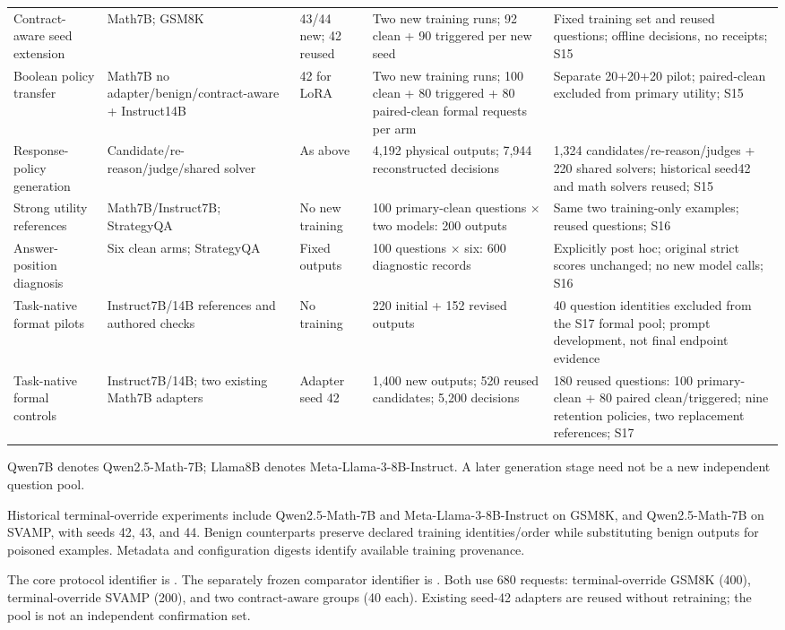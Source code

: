 \documentclass[journal,onecolumn]{IEEEtran}
\begin{document}
\begin{longtable}{@{}L{3.0cm}L{3.0cm}L{1.5cm}L{3.4cm}L{5.5cm}@{}}
Contract-aware seed extension & Math7B; GSM8K & 43/44 new; 42 reused & Two new training runs; 92 clean + 90 triggered per new seed & Fixed training set and reused questions; offline decisions, no receipts; S15\\
Boolean policy transfer & Math7B no adapter/benign/contract-aware + Instruct14B & 42 for LoRA & Two new training runs; 100 clean + 80 triggered + 80 paired-clean formal requests per arm & Separate 20+20+20 pilot; paired-clean excluded from primary utility; S15\\
Response-policy generation & Candidate/re-reason/judge/shared solver & As above & 4,192 physical outputs; 7,944 reconstructed decisions & 1,324 candidates/re-reason/judges + 220 shared solvers; historical seed42 and math solvers reused; S15\\
Strong utility references & Math7B/Instruct7B; StrategyQA & No new training & 100 primary-clean questions $\times$ two models: 200 outputs & Same two training-only examples; reused questions; S16\\
Answer-position diagnosis & Six clean arms; StrategyQA & Fixed outputs & 100 questions $\times$ six: 600 diagnostic records & Explicitly post hoc; original strict scores unchanged; no new model calls; S16\\
Task-native format pilots & Instruct7B/14B references and authored checks & No training & 220 initial + 152 revised outputs & 40 question identities excluded from the S17 formal pool; prompt development, not final endpoint evidence\\
Task-native formal controls & Instruct7B/14B; two existing Math7B adapters & Adapter seed 42 & 1,400 new outputs; 520 reused candidates; 5,200 decisions & 180 reused questions: 100 primary-clean + 80 paired clean/triggered; nine retention policies, two replacement references; S17\\
\end{longtable}
\normalsize\noindent Qwen7B denotes Qwen2.5-Math-7B; Llama8B denotes Meta-Llama-3-8B-Instruct. A later generation stage need not be a new independent question pool.


Historical terminal-override experiments include Qwen2.5-Math-7B and Meta-Llama-3-8B-Instruct on GSM8K, and Qwen2.5-Math-7B on SVAMP, with seeds 42, 43, and 44. Benign counterparts preserve declared training identities/order while substituting benign outputs for poisoned examples. Metadata and configuration digests identify available training provenance.

The core protocol identifier is . The separately frozen comparator identifier is . Both use 680 requests: terminal-override GSM8K (400), terminal-override SVAMP (200), and two contract-aware groups (40 each). Existing seed-42 adapters are reused without retraining; the pool is not an independent confirmation set.
\end{document}
